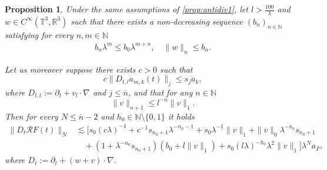 \documentclass[10pt,a4paper]{amsart}
\numberwithin{equation}{section}
\numberwithin{corollario}{section}
\numberwithin{lemma}{section}
\newtheorem{prop}{Proposition}
\numberwithin{prop}{section}
\theoremstyle{definition}
\theoremstyle{remark}
\newcommand{\N}{\mathbb{N}}
\newcommand{\R}{\mathbb{R}}
\newcommand{\T}{\mathbb{T}}
\begin{document}
\begin{prop}\label{prop:antidiv2}Under the same assumptions of \autoref{prop:antidiv1}, let $l>\frac{100}{\lambda}$ and $w\in C^{\infty}(\T^3,\R^3)$ such that there exists a non-decreasing sequence $(b_n)_{n \in \N}$ satisfying for every $n,m \in \N$
\begin{align}
  b_n\lambda^m\le b_0\lambda^{m+n}  ,
  \quad
  \|w\|_n\le b_n.
\end{align}

Let us moreover suppose there exists $c>0$ such that
\begin{equation}\label{ass:estamk2}
    c\|D_{t,l}a_{m,k}(t)\|_j \le s_j\mathring{a}_k,
\end{equation}
where $D_{t,l}:=\partial_t+v_l\cdot\nabla$ and $j\le {\overline{n}}$, and that for any $n \in \N$
\begin{equation}\label{ass:controlV}
    \|v\|_{n+1}\le l^{-n}\|v\|_1.
\end{equation}
Then for every $N\le {\overline{n}-2}$ and $h_0\in \N\setminus\{0,1\}$ it holds
     \begin{align}\label{e:Antidiv2}
         \|D_t\mathcal{R}F(t)\|_N
         &\lesssim \Big[s_0(c\lambda)^{-1}+c^{-1}s_{n_0+1}\lambda^{-n_0-1}+s_0\lambda^{-1}\|v\|_1+\|v\|_0\lambda^{-n_0} s_{n_0+1}\\
         &\quad+(1+\lambda^{-n_0} s_{n_0+1})(b_0+l\|v\|_1)+s_0(l\lambda)^{-h_0}\lambda^2\|v\|_1\Big]\lambda^Na_F,
\end{align}
where $D_t:=\partial_t+(w+v)\cdot\nabla$.
\end{prop}
\end{document}
